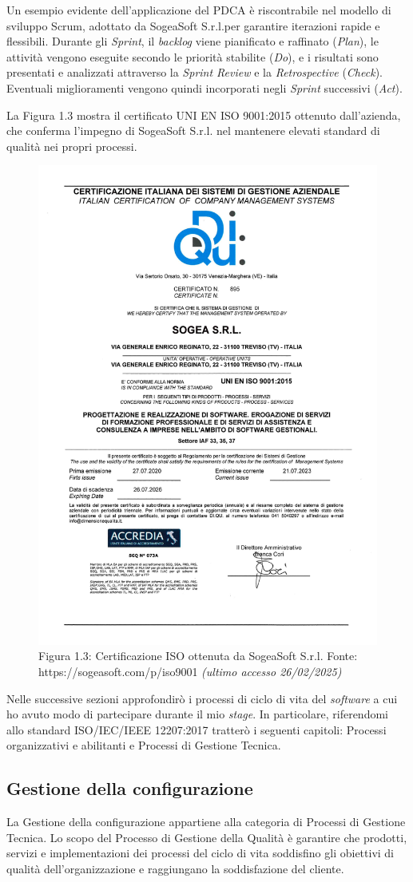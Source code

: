     \noindent Un esempio evidente dell’applicazione del PDCA è riscontrabile nel modello di sviluppo Scrum, adottato da SogeaSoft S.r.l.per garantire iterazioni rapide e flessibili. Durante gli \textit{Sprint}, il \textit{backlog} viene pianificato e raffinato (\textit{Plan}), le attività vengono eseguite secondo le priorità stabilite (\textit{Do}), e i risultati sono presentati e analizzati attraverso la \textit{Sprint Review} e la \textit{Retrospective} (\textit{Check}). Eventuali miglioramenti vengono quindi incorporati negli \textit{Sprint} successivi (\textit{Act}).
    
    \noindent La Figura 1.3 mostra il certificato UNI EN ISO 9001:2015 ottenuto dall’azienda, che conferma l’impegno di SogeaSoft S.r.l. nel mantenere elevati standard di qualità nei propri processi.

    \begin{figure}[H]
        \centering
        \includegraphics[width=0.5\linewidth]{BCS-Tessi/images/CertificatoSogea.jpg}
        \caption{Figura 1.3: Certificazione ISO ottenuta da SogeaSoft S.r.l.
        Fonte: https://sogeasoft.com/p/iso9001 \textit{(ultimo accesso 26/02/2025)}}
        \label{fig:certificazione-iso}
    \end{figure}

    \noindent Nelle successive sezioni approfondirò i processi di ciclo di vita del \textit{software} a cui ho avuto modo di partecipare durante il mio \textit{stage}. In particolare, riferendomi allo standard ISO/IEC/IEEE 12207:2017 tratterò i seguenti capitoli: Processi organizzativi e abilitanti e Processi di Gestione Tecnica.
    
    
        \subsection{Gestione della configurazione}
        La Gestione della configurazione appartiene alla categoria di Processi di Gestione Tecnica. 
        Lo scopo del Processo di Gestione della Qualità è garantire che prodotti, servizi e implementazioni dei processi del ciclo di vita soddisfino gli obiettivi di qualità dell'organizzazione e raggiungano la soddisfazione del cliente.
        
